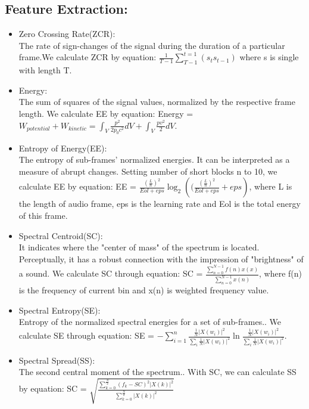 \subsection{Feature Extraction:}
\begin{itemize}
	\item Zero Crossing Rate(ZCR):\\
	The rate of sign-changes of the signal during the duration of a particular frame.\cite{b1}We calculate ZCR by equation: $\frac{1}{T-1}\sum_{T-1}^{t = 1}(s_t s_{t-1})$ where s is single with length T.\\
	\item Energy:\\
	The sum of squares of the signal values, normalized by the respective frame length.\cite{b2} We calculate EE by equation: Energy = $W_{potential} + W_{kinetic} = \int_{V}^{} \frac{p^2}{2p_0c^2} dV + \int_{V}^{} \frac{pv^2}{2}dV$.\\
	\item Entropy of Energy(EE):\\
	The entropy of sub-frames' normalized energies. It can be interpreted as a measure of abrupt changes.\cite{b2} Setting number of short blocks n to 10, we calculate EE by equation: EE = $\frac{(\frac{L}{n})^2}{Eol +eps} \log_{2}({(\frac{(\frac{L}{n})^2}{Eol +eps} + eps})$, where L is the length of audio frame, eps is the learning rate and Eol is the total energy of this frame.\\
	\item Spectral Centroid(SC):\\
	It indicates where the "center of mass" of the spectrum is located. Perceptually, it has a robust connection with the impression of "brightness" of a sound.\cite{b3} We calculate SC through equation: SC = $\frac{\sum_{n = 0}^{N - 1} f(n)x(x)}{\sum_{n = 0}^{N - 1} x(n)}$, where f(n) is the frequency of current bin and x(n) is weighted frequency value.\\
	\item Spectral Entropy(SE):\cite{b1}\\
	Entropy of the normalized spectral energies for a set of sub-frames.\cite{b3}. We calculate SE through equation: SE = $-\sum_{i = 1}^{n} \frac{\frac{1}{N} |X(w_i)|^2}{\sum_{i}^{}\frac{1}{N} |X(w_i)|^2} \ln\frac{\frac{1}{N} |X(w_i)|^2}{\sum_{i}^{}\frac{1}{N} |X(w_i)|^2}$. \\
	\item Spectral Spread(SS):\\
	The second central moment of the spectrum.\cite{b3}. With SC, we can calculate SS by equation: SC = $\sqrt{\frac{\sum_{k = 0}^{\frac{N}{2}} (f_k-SC)^2 |X(k)|^2}{\sum_{k = 0}^{\frac{N}{2}} |X(k)|^2 }}$\\

\end{itemize}
